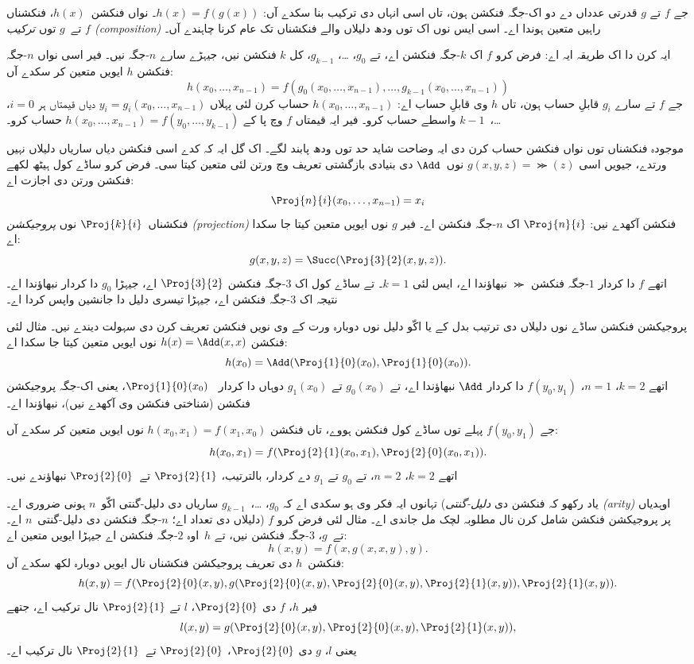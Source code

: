 \documentclass[../../../include/open-logic-section]{subfiles}
\begin{document}

جے $f$ تے $g$ قدرتی عدداں دے دو اک-جگہ فنکشن
ہون، تاں اسی انہاں دی ترکیب بنا سکدے آں:
$h(x) = f(g(x))$۔ نواں فنکشن~$h(x)$، فنکشناں
$f$ تے~$g$ توں \emph{ترکیب (composition)}
راہیں متعین ہوندا اے۔ اسی ایس نوں اک توں ودھ
دلیلاں والے فنکشناں تک عام کرنا چاہندے آں۔

ایہ کرن دا اک طریقہ ایہ اے: فرض کرو $f$ اک
$k$-جگہ فنکشن اے، تے $g_0$، \dots،
$g_{k-1}$، کل $k$ فنکشن نیں، جیہڑے سارے
$n$-جگہ نیں۔ فیر اسی نواں $n$-جگہ فنکشن
$h$ ایویں متعین کر سکدے آں:
\[
h(x_0, \dots, x_{n-1}) =
f(g_0(x_0, \dots, x_{n-1}), \dots, g_{k-1}(x_0, \dots, x_{n-1}))
\]
جے $f$ تے سارے $g_i$ قابلِ حساب ہون، تاں
$h$ وی قابلِ حساب اے: $h(x_0,
\dots, x_{n-1})$ حساب کرن لئی پہلاں
$y_i = g_i(x_0, \dots, x_{n-1})$ دیاں
قیمتاں ہر $i = 0$، \dots،~$k-1$
واسطے حساب کرو۔ فیر ایہ قیمتاں $f$ وچ
پا کے $h(x_0, \dots, x_{n-1}) =
f(y_0, \dots, y_{k-1})$ حساب کرو۔

موجودہ فنکشناں توں نواں فنکشن حساب کرن دی ایہ
وضاحت شاید حد توں ودھ پابند لگے۔ اک گل ایہ
کہ کدے اسی فنکشن دیاں ساریاں دلیلاں نہیں
ورتدے، جیویں اسی $g(x, y, z) = \Succ(z)$
نوں~$\Add$ دی بنیادی بازگشتی تعریف وچ
ورتن لئی متعین کیتا سی۔ فرض کرو ساڈے کول ہیٹھ لکھے
فنکشن ورتن دی اجازت اے:
\[
\Proj{n}{i}(x_0, \dots, x_{n-1}) = x_i
\]
فنکشناں~$\Proj{k}{i}$ نوں
\emph{پروجیکشن (projection)} فنکشن آکھدے نیں:
$\Proj{n}{i}$ اک $n$-جگہ فنکشن اے۔ فیر
$g$ نوں ایویں متعین کیتا جا سکدا اے:
\[
g(x, y, z) = \Succ(\Proj{3}{2}(x, y, z)).
\]
اتھے $f$ دا کردار $1$-جگہ فنکشن $\Succ$
نبھاؤندا اے، ایس لئی $k=1$۔ تے ساڈے کول
اک $3$-جگہ فنکشن $\Proj{3}{2}$ اے،
جیہڑا $g_0$ دا کردار نبھاؤندا اے۔ نتیجہ
اک $3$-جگہ فنکشن اے، جیہڑا تیسری دلیل
دا جانشین واپس کردا اے۔

پروجیکشن فنکشن ساڈے نوں دلیلاں دی ترتیب
بدل کے یا اکّو دلیل نوں دوبارہ ورت کے وی
نویں فنکشن تعریف کرن دی سہولت دیندے نیں۔
مثال لئی فنکشن $h(x) = \Add(x, x)$ نوں
ایویں متعین کیتا جا سکدا اے:
\[
h(x_0) = \Add(\Proj{1}{0}(x_0),\Proj{1}{0}(x_0)).
\]
اتھے $k=2$، $n=1$، $f(y_0,y_1)$ دا
کردار $\Add$ نبھاؤندا اے، تے
$g_0(x_0)$ تے $g_1(x_0)$ دوہاں دا کردار
~$\Proj{1}{0}(x_0)$، یعنی اک-جگہ
پروجیکشن فنکشن (شناختی فنکشن وی آکھدے نیں)،
نبھاؤندا اے۔

جے $f(y_0, y_1)$ پہلے توں ساڈے کول فنکشن
ہووے، تاں فنکشن $h(x_0, x_1) = f(x_1, x_0)$
نوں ایویں متعین کر سکدے آں:
\[
h(x_0, x_1) = f(\Proj{2}{1}(x_0, x_1),\Proj{2}{0}(x_0, x_1)).
\]
اتھے $k=2$، $n = 2$، تے $g_0$ تے
$g_1$ دے کردار، بالترتیب، $\Proj{2}{1}$
تے~$\Proj{2}{0}$ نبھاؤندے نیں۔

تہانوں ایہ فکر وی ہو سکدی اے کہ $g_0$،
\dots،~$g_{k-1}$ ساریاں دی دلیل-گنتی
اکّو~$n$ ہونی ضروری اے۔ (یاد رکھو کہ
فنکشن دی \emph{دلیل-گنتی (arity)} اوہدیاں
دلیلاں دی تعداد اے؛ $n$-جگہ فنکشن دی
دلیل-گنتی~$n$ اے۔) پر پروجیکشن فنکشن
شامل کرن نال مطلوبہ لچک مل جاندی اے۔
مثال لئی فرض کرو $f$ تے~$g$، $3$-جگہ
فنکشن نیں، تے $h$~اوہ $2$-جگہ فنکشن اے
جیہڑا ایویں متعین اے:
\[
h(x,y) = f(x,g(x,x,y),y).
\]
فنکشن~$h$ دی تعریف پروجیکشن فنکشناں نال
ایویں دوبارہ لکھ سکدے آں:
\[
h(x,y) = f(\Proj{2}{0}(x,y), g(\Proj{2}{0}(x,y), \Proj{2}{0}(x,y),
\Proj{2}{1}(x,y)), \Proj{2}{1}(x,y)).
\]
فیر $h$، $f$ دی $\Proj{2}{0}$،
$l$ تے $\Proj{2}{1}$ نال ترکیب اے، جتھے
\[
l(x,y) = g(\Proj{2}{0}(x,y),\Proj{2}{0}(x,y),\Proj{2}{1}(x,y)),
\]
یعنی $l$، $g$ دی $\Proj{2}{0}$،
$\Proj{2}{0}$ تے~$\Proj{2}{1}$
نال ترکیب اے۔
\end{document}
